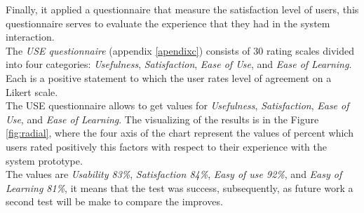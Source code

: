 Finally, it applied a questionnaire that measure the satisfaction
level of users, this questionnaire serves to evaluate the experience
that they had in the system interaction. \\The \textit{USE
questionnaire} (appendix  \ref{apendixc}) consists of 30 rating
scales divided into four categories: \textit{Usefulness},
\textit{Satisfaction}, \textit{Ease of Use}, and \textit{Ease of
Learning}. Each is a positive statement to which the user rates level
of agreement on a Likert scale. \\ The USE questionnaire allows to get
values for \textit{Usefulness}, \textit{Satisfaction}, \textit{Ease of
Use}, and \textit{Ease of Learning}. The visualizing of the results is in
the Figure  \ref{fig:radial}, where the four axis of the chart
represent the values of percent which users rated positively this
factors with respect to their experience with the system prototype.\\ 
The values are \textit{Usability 83\%}, \textit{Satisfaction 84\%},
\textit{Easy of use  92\%}, and \textit{Easy of Learning 81\%}, it
means that the test was success, subsequently, as future work  a
second test will be make to compare the improves.


